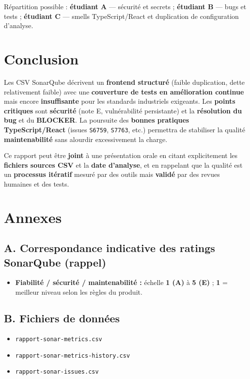 \documentclass[11pt,a4paper]{article}
\begin{document}
Répartition possible : \textbf{étudiant A} --- sécurité et secrets ; \textbf{étudiant B} --- bugs et tests ; \textbf{étudiant C} --- smells TypeScript/React et duplication de configuration d'analyse.

\section{Conclusion}

Les CSV SonarQube décrivent un \textbf{frontend structuré} (faible duplication, dette relativement faible) avec une \textbf{couverture de tests en amélioration continue} mais encore \textbf{insuffisante} pour les standards industriels exigeants. Les \textbf{points critiques} sont \textbf{sécurité} (note E, vulnérabilité persistante) et la \textbf{résolution du bug} et du \textbf{BLOCKER}. La poursuite des \textbf{bonnes pratiques TypeScript/React} (issues \texttt{S6759}, \texttt{S7763}, etc.) permettra de stabiliser la qualité \textbf{maintenabilité} sans alourdir excessivement la charge.

Ce rapport peut être \textbf{joint} à une présentation orale en citant explicitement les \textbf{fichiers sources CSV} et la \textbf{date d'analyse}, et en rappelant que la qualité est un \textbf{processus itératif} mesuré par des outils mais \textbf{validé} par des revues humaines et des tests.

\section*{Annexes}

\subsection*{A. Correspondance indicative des ratings SonarQube (rappel)}

\begin{itemize}[noitemsep]
  \item \textbf{Fiabilité / sécurité / maintenabilité :} échelle \textbf{1 (A)} à \textbf{5 (E)} ; \textbf{1} = meilleur niveau selon les règles du produit.
\end{itemize}

\subsection*{B. Fichiers de données}

\begin{itemize}[noitemsep]
  \item \texttt{rapport-sonar-metrics.csv}
  \item \texttt{rapport-sonar-metrics-history.csv}
  \item \texttt{rapport-sonar-issues.csv}
\end{itemize}
\end{document}
